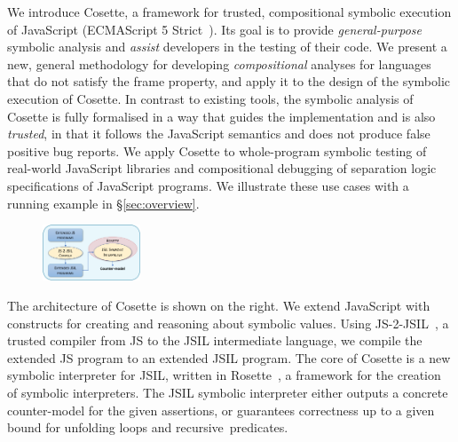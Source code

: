 \documentclass[sigconf, review]{acmart}
\newcommand{\jsil}{JSIL\xspace}
\newcommand{\JSComp}{JS-2-JSIL\xspace}
\newcommand{\cosette}{Cosette\xspace}
\newcommand{\pmaxinline}[1]{ {\color{blue} *** PM : #1 ***} }
\begin{document}
  We introduce \cosette, a framework for trusted, compositional 
  symbolic execution of JavaScript
  (ECMAScript 5 Strict~\cite{ecma}). 
  Its goal is to
  provide \emph{general-purpose} symbolic analysis and {\em assist} 
  developers in the testing of their code.
  We present a new, general methodology for developing {\em compositional} 
  analyses for languages that do not satisfy the frame property, 
  and apply it to the design of the symbolic execution of Cosette. 
  In contrast to existing tools, the symbolic analysis of \cosette 
  is fully formalised in a way that guides the implementation and is
  also {\em trusted}, in that it  follows the JavaScript
  semantics and does not produce false positive bug reports.
  We apply Cosette to whole-program symbolic testing of 
  real-world JavaScript libraries and compositional debugging of separation 
  logic specifications of JavaScript programs. We illustrate these use cases 
  with a running example in \S\ref{sec:overview}.

\begin{figure}
\vspace*{-0.3cm}
\hspace*{-0.63cm}
\centering
\includegraphics[width=0.26\textwidth]{figures/jilette_blue.png}
\vspace*{-0.55cm}
\label{fig:jilette:diagram}
\end{figure}

The architecture of \cosette is shown on the right. We extend JavaScript with constructs for creating and reasoning about symbolic values. Using \JSComp~\cite{javert}, a trusted compiler from JS to the \jsil intermediate language, we compile the extended JS program to an extended \jsil program. The core of \cosette is a new symbolic interpreter for
\jsil,  written in 
Rosette~\cite{Rosette2,Rosette1}, a framework for the creation of
symbolic interpreters. The 
JSIL symbolic interpreter either outputs a concrete counter-model for the given assertions, or guarantees correctness up to a given bound for unfolding loops and recursive~predicates. %
\end{document}
